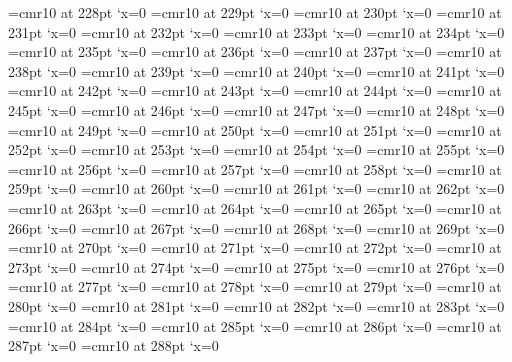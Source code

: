 \font\FBNO=cmr10 at 228pt \lpcode\FBNO`x=0
\font\FBNP=cmr10 at 229pt \lpcode\FBNP`x=0
\font\FBNQ=cmr10 at 230pt \lpcode\FBNQ`x=0
\font\FBNR=cmr10 at 231pt \lpcode\FBNR`x=0
\font\FBNS=cmr10 at 232pt \lpcode\FBNS`x=0
\font\FBNT=cmr10 at 233pt \lpcode\FBNT`x=0
\font\FBNU=cmr10 at 234pt \lpcode\FBNU`x=0
\font\FBNV=cmr10 at 235pt \lpcode\FBNV`x=0
\font\FBNW=cmr10 at 236pt \lpcode\FBNW`x=0
\font\FBNX=cmr10 at 237pt \lpcode\FBNX`x=0
\font\FBNY=cmr10 at 238pt \lpcode\FBNY`x=0
\font\FBNZ=cmr10 at 239pt \lpcode\FBNZ`x=0
\font\FBOA=cmr10 at 240pt \lpcode\FBOA`x=0
\font\FBOB=cmr10 at 241pt \lpcode\FBOB`x=0
\font\FBOC=cmr10 at 242pt \lpcode\FBOC`x=0
\font\FBOD=cmr10 at 243pt \lpcode\FBOD`x=0
\font\FBOE=cmr10 at 244pt \lpcode\FBOE`x=0
\font\FBOF=cmr10 at 245pt \lpcode\FBOF`x=0
\font\FBOG=cmr10 at 246pt \lpcode\FBOG`x=0
\font\FBOH=cmr10 at 247pt \lpcode\FBOH`x=0
\font\FBOI=cmr10 at 248pt \lpcode\FBOI`x=0
\font\FBOJ=cmr10 at 249pt \lpcode\FBOJ`x=0
\font\FBOK=cmr10 at 250pt \lpcode\FBOK`x=0
\font\FBOL=cmr10 at 251pt \lpcode\FBOL`x=0
\font\FBOM=cmr10 at 252pt \lpcode\FBOM`x=0
\font\FBON=cmr10 at 253pt \lpcode\FBON`x=0
\font\FBOO=cmr10 at 254pt \lpcode\FBOO`x=0
\font\FBOP=cmr10 at 255pt \lpcode\FBOP`x=0
\font\FBOQ=cmr10 at 256pt \lpcode\FBOQ`x=0
\font\FBOR=cmr10 at 257pt \lpcode\FBOR`x=0
\font\FBOS=cmr10 at 258pt \lpcode\FBOS`x=0
\font\FBOT=cmr10 at 259pt \lpcode\FBOT`x=0
\font\FBOU=cmr10 at 260pt \lpcode\FBOU`x=0
\font\FBOV=cmr10 at 261pt \lpcode\FBOV`x=0
\font\FBOW=cmr10 at 262pt \lpcode\FBOW`x=0
\font\FBOX=cmr10 at 263pt \lpcode\FBOX`x=0
\font\FBOY=cmr10 at 264pt \lpcode\FBOY`x=0
\font\FBOZ=cmr10 at 265pt \lpcode\FBOZ`x=0
\font\FBPA=cmr10 at 266pt \lpcode\FBPA`x=0
\font\FBPB=cmr10 at 267pt \lpcode\FBPB`x=0
\font\FBPC=cmr10 at 268pt \lpcode\FBPC`x=0
\font\FBPD=cmr10 at 269pt \lpcode\FBPD`x=0
\font\FBPE=cmr10 at 270pt \lpcode\FBPE`x=0
\font\FBPF=cmr10 at 271pt \lpcode\FBPF`x=0
\font\FBPG=cmr10 at 272pt \lpcode\FBPG`x=0
\font\FBPH=cmr10 at 273pt \lpcode\FBPH`x=0
\font\FBPI=cmr10 at 274pt \lpcode\FBPI`x=0
\font\FBPJ=cmr10 at 275pt \lpcode\FBPJ`x=0
\font\FBPK=cmr10 at 276pt \lpcode\FBPK`x=0
\font\FBPL=cmr10 at 277pt \lpcode\FBPL`x=0
\font\FBPM=cmr10 at 278pt \lpcode\FBPM`x=0
\font\FBPN=cmr10 at 279pt \lpcode\FBPN`x=0
\font\FBPO=cmr10 at 280pt \lpcode\FBPO`x=0
\font\FBPP=cmr10 at 281pt \lpcode\FBPP`x=0
\font\FBPQ=cmr10 at 282pt \lpcode\FBPQ`x=0
\font\FBPR=cmr10 at 283pt \lpcode\FBPR`x=0
\font\FBPS=cmr10 at 284pt \lpcode\FBPS`x=0
\font\FBPT=cmr10 at 285pt \lpcode\FBPT`x=0
\font\FBPU=cmr10 at 286pt \lpcode\FBPU`x=0
\font\FBPV=cmr10 at 287pt \lpcode\FBPV`x=0
\font\FBPW=cmr10 at 288pt \lpcode\FBPW`x=0
